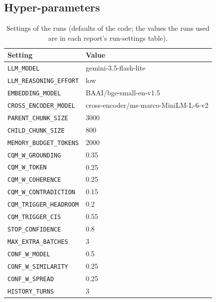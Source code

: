 \subsection*{Hyper-parameters}
\begin{table}[h]\centering\small\begin{tabular}{ll}\toprule Setting & Value \\ \midrule
\texttt{LLM\_MODEL} & gemini-3.5-flash-lite \\
\texttt{LLM\_REASONING\_EFFORT} & low \\
\texttt{EMBEDDING\_MODEL} & BAAI/bge-small-en-v1.5 \\
\texttt{CROSS\_ENCODER\_MODEL} & cross-encoder/ms-marco-MiniLM-L-6-v2 \\
\texttt{PARENT\_CHUNK\_SIZE} & 3000 \\
\texttt{CHILD\_CHUNK\_SIZE} & 800 \\
\texttt{MEMORY\_BUDGET\_TOKENS} & 2000 \\
\texttt{CQM\_W\_GROUNDING} & 0.35 \\
\texttt{CQM\_W\_TOKEN} & 0.25 \\
\texttt{CQM\_W\_COHERENCE} & 0.25 \\
\texttt{CQM\_W\_CONTRADICTION} & 0.15 \\
\texttt{CQM\_TRIGGER\_HEADROOM} & 0.2 \\
\texttt{CQM\_TRIGGER\_CIS} & 0.55 \\
\texttt{STOP\_CONFIDENCE} & 0.8 \\
\texttt{MAX\_EXTRA\_BATCHES} & 3 \\
\texttt{CONF\_W\_MODEL} & 0.5 \\
\texttt{CONF\_W\_SIMILARITY} & 0.25 \\
\texttt{CONF\_W\_SPREAD} & 0.25 \\
\texttt{HISTORY\_TURNS} & 3 \\
\bottomrule\end{tabular}\caption{Settings of the runs (defaults of the code; the values the runs used are in each report's run-settings table).}\end{table}
